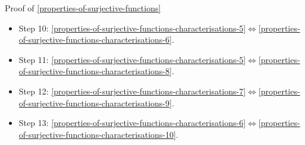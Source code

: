 \begin{Proof}{Proof of \cref{properties-of-surjective-functions}}
\begin{itemize}
        \item Step 10: \cref{properties-of-surjective-functions-characterisations-5}$\iff$\cref{properties-of-surjective-functions-characterisations-6}.
        \item Step 11: \cref{properties-of-surjective-functions-characterisations-5}$\iff$\cref{properties-of-surjective-functions-characterisations-8}.
        \item Step 12: \cref{properties-of-surjective-functions-characterisations-7}$\iff$\cref{properties-of-surjective-functions-characterisations-9}.
        \item Step 13: \cref{properties-of-surjective-functions-characterisations-6}$\iff$\cref{properties-of-surjective-functions-characterisations-10}.
    \end{itemize}


\end{Proof}
